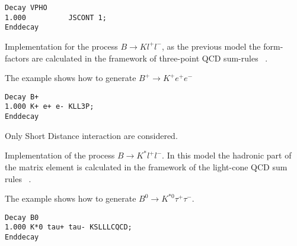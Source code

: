 \Example
\begin{verbatim}
Decay VPHO
1.000          JSCONT 1;
Enddecay
\end{verbatim}





\label{KLL3P}



\Expl
Implementation for the process $B\rightarrow K l^+ l^-$, as the previous model
the form-factors are calculated in the framework of three-point QCD sum-rules ~\cite{Colangelo96}.
 
\Example
The example shows how to generate $B^+\rightarrow K^{+} e^+ e^-$
\begin{verbatim}
Decay B+
1.000 K+ e+ e- KLL3P;
Enddecay
\end{verbatim}

\Notes
Only Short Distance interaction are considered.\\







%
%
%
%
%
%
%
%

\label{KSLLLCQCD}



\Expl
Implementation of the process $B\rightarrow K^* l^+ l^-$.
In this model the hadronic part of the matrix element is 
calculated in the framework of the light-cone QCD
sum rules ~\cite{Aliev97}.
 
\Example
The example shows how to generate $B^0\rightarrow K^{*0} \tau^+ \tau^-$.
\begin{verbatim}
Decay B0
1.000 K*0 tau+ tau- KSLLLCQCD;
Enddecay
\end{verbatim}

